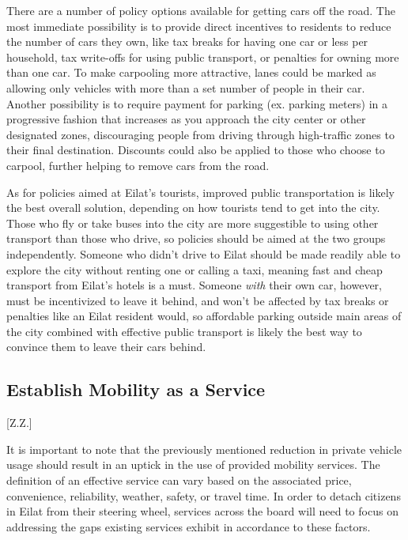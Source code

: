 \documentclass[12pt]{article}                       %
\begin{document}
There are a number of policy options available for getting cars off the road. The most immediate possibility is to provide direct incentives to residents to reduce the number of cars they own, like tax breaks for having one car or less per household, tax write-offs for using public transport, or penalties for owning more than one car. To make carpooling more attractive, lanes could be marked as allowing only vehicles with more than a set number of people in their car. Another possibility is to require payment for parking (ex. parking meters) in a progressive fashion that increases as you approach the city center or other designated zones, discouraging people from driving through high-traffic zones to their final destination. Discounts could also be applied to those who choose to carpool, further helping to remove cars from the road.

As for policies aimed at Eilat's tourists, improved public transportation is likely the best overall solution, depending on how tourists tend to get into the city. Those who fly or take buses into the city are more suggestible to using other transport than those who drive, so policies should be aimed at the two groups independently. Someone who didn't drive to Eilat should be made readily able to explore the city without renting one or calling a taxi, meaning fast and cheap transport from Eilat's hotels is a must. Someone \textit{with} their own car, however, must be incentivized to leave it behind, and won't be affected by tax breaks or penalties like an Eilat resident would, so affordable parking outside main areas of the city combined with effective public transport is likely the best way to convince them to leave their cars behind.

\subsection{Establish Mobility as a Service}[Z.Z.]    

It is important to note that the previously mentioned reduction in private vehicle usage should result in an uptick in the use of provided mobility services. The definition of an effective service can vary based on the associated price, convenience, reliability, weather, safety, or travel time. In order to detach citizens in Eilat from their steering wheel, services across the board will need to focus on addressing the gaps existing services exhibit in accordance to these factors. 
\end{document}

